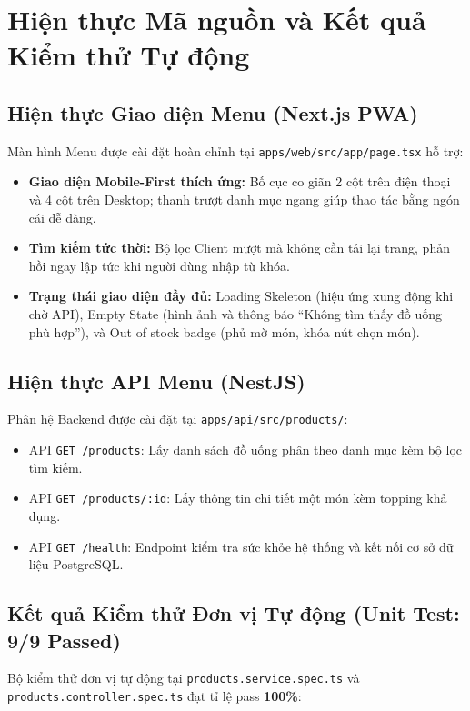 \documentclass[a4paper]{article}
\begin{document}
\section{Hiện thực Mã nguồn và Kết quả Kiểm thử Tự động}

\subsection{Hiện thực Giao diện Menu (Next.js PWA)}
Màn hình Menu được cài đặt hoàn chỉnh tại \nolinkurl{apps/web/src/app/page.tsx} hỗ trợ:
\begin{itemize}
    \item \textbf{Giao diện Mobile-First thích ứng:} Bố cục co giãn 2 cột trên điện thoại và 4 cột trên Desktop; thanh trượt danh mục ngang giúp thao tác bằng ngón cái dễ dàng.
    \item \textbf{Tìm kiếm tức thời:} Bộ lọc Client mượt mà không cần tải lại trang, phản hồi ngay lập tức khi người dùng nhập từ khóa.
    \item \textbf{Trạng thái giao diện đầy đủ:} Loading Skeleton (hiệu ứng xung động khi chờ API), Empty State (hình ảnh và thông báo ``Không tìm thấy đồ uống phù hợp''), và Out of stock badge (phủ mờ món, khóa nút chọn món).
\end{itemize}

\subsection{Hiện thực API Menu (NestJS)}
Phân hệ Backend được cài đặt tại \nolinkurl{apps/api/src/products/}:
\begin{itemize}
    \item API \texttt{GET /products}: Lấy danh sách đồ uống phân theo danh mục kèm bộ lọc tìm kiếm.
    \item API \texttt{GET /products/:id}: Lấy thông tin chi tiết một món kèm topping khả dụng.
    \item API \texttt{GET /health}: Endpoint kiểm tra sức khỏe hệ thống và kết nối cơ sở dữ liệu PostgreSQL.
\end{itemize}

\subsection{Kết quả Kiểm thử Đơn vị Tự động (Unit Test: 9/9 Passed)}
Bộ kiểm thử đơn vị tự động tại \nolinkurl{products.service.spec.ts} và \nolinkurl{products.controller.spec.ts} đạt tỉ lệ pass \textbf{100\%}:
\end{document}
